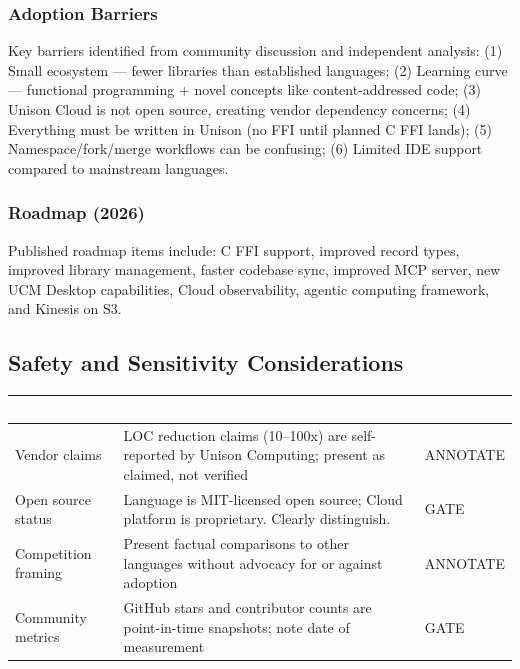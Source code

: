 \documentclass[11pt,letterpaper]{article}
\newcommand{\tableheader}[1]{\textbf{\sffamily\textcolor{white}{#1}}}
\begin{document}
\subsubsection{Adoption Barriers}

Key barriers identified from community discussion and independent analysis: (1) Small ecosystem --- fewer libraries than established languages; (2) Learning curve --- functional programming + novel concepts like content-addressed code; (3) Unison Cloud is not open source, creating vendor dependency concerns; (4) Everything must be written in Unison (no FFI until planned C FFI lands); (5) Namespace/fork/merge workflows can be confusing; (6) Limited IDE support compared to mainstream languages.

\subsubsection{Roadmap (2026)}

Published roadmap items include: C FFI support, improved record types, improved library management, faster codebase sync, improved MCP server, new UCM Desktop capabilities, Cloud observability, agentic computing framework, and Kinesis on S3.

\subsection{Safety and Sensitivity Considerations}

\begin{center}
\begin{tabularx}{\textwidth}{L{3cm}XC{2cm}}
\toprule
{}
\tableheader{Area} & \tableheader{Consideration} & \tableheader{Boundary} \\
\midrule
Vendor claims & LOC reduction claims (10--100x) are self-reported by Unison Computing; present as claimed, not verified & ANNOTATE \\
Open source status & Language is MIT-licensed open source; Cloud platform is proprietary. Clearly distinguish. & GATE \\
Competition framing & Present factual comparisons to other languages without advocacy for or against adoption & ANNOTATE \\
Community metrics & GitHub stars and contributor counts are point-in-time snapshots; note date of measurement & GATE \\
\bottomrule
\end{tabularx}
\end{center}
\end{document}
